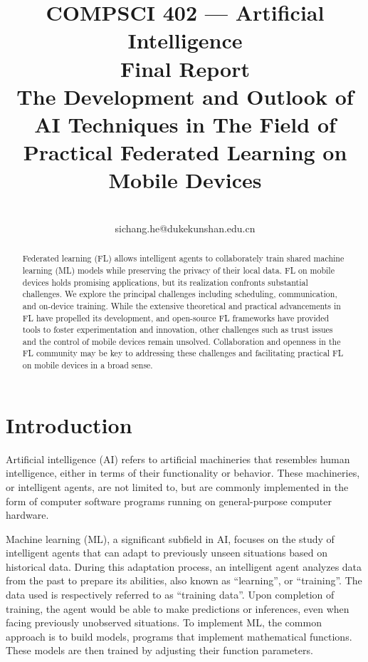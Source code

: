 \documentclass[conference]{IEEEtran}
\begin{document}
\title{
    COMPSCI 402 --- Artificial Intelligence\\
    Final Report\\
    The Development and Outlook of AI Techniques in The Field of
    Practical Federated Learning on Mobile Devices
}

\author{
    \\
    sichang.he@dukekunshan.edu.cn
}

\maketitle

\begin{abstract}

Federated learning (FL) allows intelligent agents to
collaborately train shared machine learning (ML) models while
preserving the privacy of their local data.
FL on mobile devices holds promising applications,
but its realization confronts substantial challenges.
We explore the principal challenges including
scheduling, communication, and on-device training.
While the extensive theoretical and practical advancements in FL have
propelled its development,
and open-source FL frameworks have provided tools to
foster experimentation and innovation,
other challenges such as trust issues and
the control of mobile devices remain unsolved.
Collaboration and openness in the FL community may be key to
addressing these challenges and
facilitating practical FL on mobile devices in a broad sense.

\end{abstract}

\section{Introduction}


Artificial intelligence (AI) refers to
artificial machineries that resembles human intelligence,
either in terms of their functionality or behavior.
These machineries, or intelligent agents,
are not limited to,
but are commonly implemented in the form of computer software programs
running on general-purpose computer hardware.

Machine learning (ML), a significant subfield in AI,
focuses on the study of intelligent agents that can
adapt to previously unseen situations based on historical data.
During this adaptation process,
an intelligent agent analyzes data from the past to
prepare its abilities,
also known as ``learning'', or ``training''.
The data used is respectively referred to as ``training data''.
Upon completion of training,
the agent would be able to make predictions or inferences,
even when facing previously unobserved situations.
To implement ML, the common approach is to build models,
programs that implement mathematical functions.
These models are then trained by adjusting their function parameters.
\end{document}
